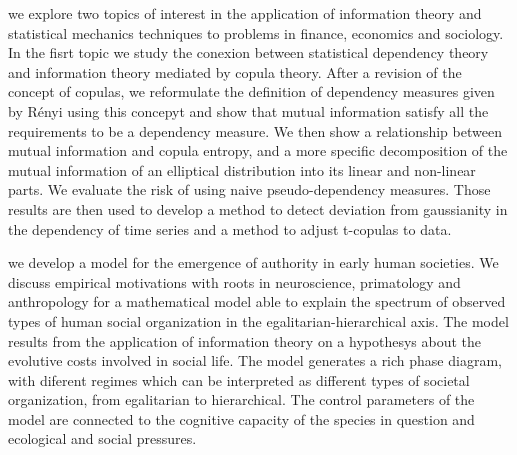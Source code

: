  we explore two topics of interest in the application of information theory and statistical mechanics techniques to problems in finance, economics and sociology. In the fisrt topic we study the conexion between statistical dependency theory and information theory mediated by copula theory. After a revision of the concept of copulas, we reformulate the definition of dependency measures given by Rényi \citep{Renyi1959} using this concepyt and show that mutual information satisfy all the requirements to be a dependency measure. We then show a relationship between mutual information and copula entropy, and a more specific decomposition of the mutual information of an elliptical distribution into its linear and non-linear parts. We evaluate the risk of using naive pseudo-dependency measures. Those results are then used to develop a method to detect deviation from gaussianity in the dependency of time series and a method to adjust t-copulas to data\citep{Calsaverini2009}.

 we develop a model for the emergence of authority in early human societies. We discuss empirical motivations with roots in neuroscience, primatology and anthropology for a mathematical model able to explain the spectrum of observed types of human social organization in the egalitarian-hierarchical axis. The model results from the application of information theory on a hypothesys about the evolutive costs involved in social life. The model generates a rich phase diagram, with diferent regimes which can be interpreted as different types of societal organization, from egalitarian to hierarchical. The control parameters of the model are connected to the cognitive capacity of the species in question and ecological and social pressures.